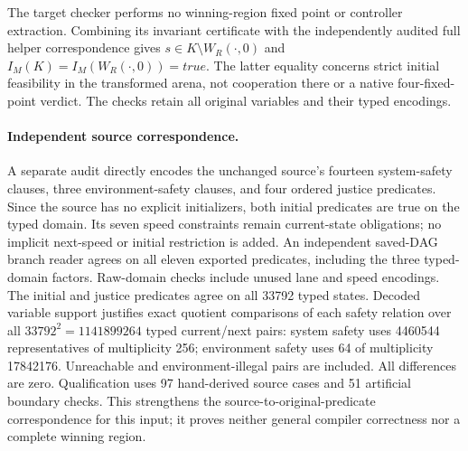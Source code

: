 The target checker performs no winning-region fixed point or
controller extraction. Combining its invariant certificate with
the independently audited full helper correspondence gives
$s\in K\setminus W_R(\cdot,0)$ and
$I_M(K)=I_M(W_R(\cdot,0))=\mathit{true}$.
The latter equality concerns strict initial feasibility in the
transformed arena, not cooperation there or a native four-fixed-point
verdict. The checks retain all original variables and their typed encodings.

\paragraph{Independent source correspondence.}
A separate audit directly encodes the unchanged source's fourteen
system-safety clauses, three environment-safety clauses, and four
ordered justice predicates. Since the source has no explicit
initializers, both initial predicates are true on the typed domain. Its seven speed
constraints remain current-state obligations; no implicit next-speed
or initial restriction is added. An independent saved-DAG branch
reader agrees on all eleven exported predicates, including the three
typed-domain factors. Raw-domain checks include unused lane and speed
encodings. The initial and justice predicates agree on all 33792
typed states. Decoded variable support justifies exact quotient
comparisons of each safety relation over all $33792^2=1141899264$
typed current/next pairs: system safety uses 4460544 representatives
of multiplicity 256; environment safety uses 64 of multiplicity
17842176. Unreachable and environment-illegal pairs are included.
All differences are zero. Qualification uses 97 hand-derived
source cases and 51 artificial boundary checks. This strengthens the
source-to-original-predicate correspondence for this input; it proves
neither general compiler correctness nor a complete winning region.

